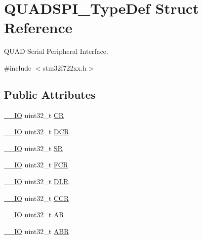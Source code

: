 \hypertarget{struct_q_u_a_d_s_p_i___type_def}{}\section{Q\+U\+A\+D\+S\+P\+I\+\_\+\+Type\+Def Struct Reference}
\label{struct_q_u_a_d_s_p_i___type_def}


Q\+U\+AD Serial Peripheral Interface.  




{\ttfamily \#include $<$stm32f722xx.\+h$>$}

\subsection*{Public Attributes}
\begin{DoxyCompactItemize}
\item 
\mbox{\hyperlink{core__sc300_8h_aec43007d9998a0a0e01faede4133d6be}{\+\_\+\+\_\+\+IO}} uint32\+\_\+t \mbox{\hyperlink{struct_q_u_a_d_s_p_i___type_def_ad6a1c5cd7b36de02e3969fb9c469beea}{CR}}
\item 
\mbox{\hyperlink{core__sc300_8h_aec43007d9998a0a0e01faede4133d6be}{\+\_\+\+\_\+\+IO}} uint32\+\_\+t \mbox{\hyperlink{struct_q_u_a_d_s_p_i___type_def_a8901a4df6a4d50b741c4544290cbee04}{D\+CR}}
\item 
\mbox{\hyperlink{core__sc300_8h_aec43007d9998a0a0e01faede4133d6be}{\+\_\+\+\_\+\+IO}} uint32\+\_\+t \mbox{\hyperlink{struct_q_u_a_d_s_p_i___type_def_acbabc913eb6a81051e7a73297d1b0756}{SR}}
\item 
\mbox{\hyperlink{core__sc300_8h_aec43007d9998a0a0e01faede4133d6be}{\+\_\+\+\_\+\+IO}} uint32\+\_\+t \mbox{\hyperlink{struct_q_u_a_d_s_p_i___type_def_ace4b7e4af14eec39dec9575d43d28d84}{F\+CR}}
\item 
\mbox{\hyperlink{core__sc300_8h_aec43007d9998a0a0e01faede4133d6be}{\+\_\+\+\_\+\+IO}} uint32\+\_\+t \mbox{\hyperlink{struct_q_u_a_d_s_p_i___type_def_a3993f6897eafcd53b3d9246f970da991}{D\+LR}}
\item 
\mbox{\hyperlink{core__sc300_8h_aec43007d9998a0a0e01faede4133d6be}{\+\_\+\+\_\+\+IO}} uint32\+\_\+t \mbox{\hyperlink{struct_q_u_a_d_s_p_i___type_def_aa2e69474978a87b7a24b4b0e4da3c673}{C\+CR}}
\item 
\mbox{\hyperlink{core__sc300_8h_aec43007d9998a0a0e01faede4133d6be}{\+\_\+\+\_\+\+IO}} uint32\+\_\+t \mbox{\hyperlink{struct_q_u_a_d_s_p_i___type_def_abf9f879cef8fff9883f1654f3cd14125}{AR}}
\item 
\mbox{\hyperlink{core__sc300_8h_aec43007d9998a0a0e01faede4133d6be}{\+\_\+\+\_\+\+IO}} uint32\+\_\+t \mbox{\hyperlink{struct_q_u_a_d_s_p_i___type_def_af989aa29f188fdda929cd5f350ff27c5}{A\+BR}}

\end{DoxyCompactItemize}
